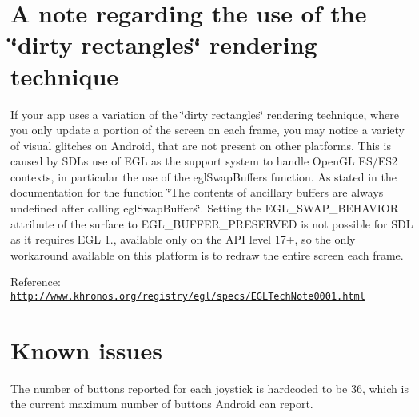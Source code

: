  \section*{A note regarding the use of the \char`\"{}dirty rectangles\char`\"{} rendering technique }

If your app uses a variation of the \char`\"{}dirty rectangles\char`\"{} rendering technique, where you only update a portion of the screen on each frame, you may notice a variety of visual glitches on Android, that are not present on other platforms. This is caused by S\+DL\textquotesingle{}s use of E\+GL as the support system to handle Open\+GL E\+S/\+E\+S2 contexts, in particular the use of the egl\+Swap\+Buffers function. As stated in the documentation for the function \char`\"{}\+The contents of ancillary buffers are always 
undefined after calling egl\+Swap\+Buffers\char`\"{}. Setting the E\+G\+L\+\_\+\+S\+W\+A\+P\+\_\+\+B\+E\+H\+A\+V\+I\+OR attribute of the surface to E\+G\+L\+\_\+\+B\+U\+F\+F\+E\+R\+\_\+\+P\+R\+E\+S\+E\+R\+V\+ED is not possible for S\+DL as it requires E\+GL 1., available only on the A\+PI level 17+, so the only workaround available on this platform is to redraw the entire screen each frame.

Reference\+: \href{http://www.khronos.org/registry/egl/specs/EGLTechNote0001.html}{\tt http\+://www.\+khronos.\+org/registry/egl/specs/\+E\+G\+L\+Tech\+Note0001.\+html}



 \section*{Known issues }


\begin{DoxyItemize}
\item The number of buttons reported for each joystick is hardcoded to be 36, which is the current maximum number of buttons Android can report. 
\end{DoxyItemize}